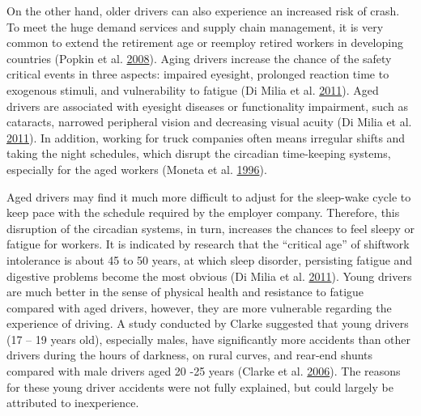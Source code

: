 \documentclass[12pt]{book}
\numberwithin{equation}{chapter}
\begin{document}
On the other hand, older drivers can also experience an increased risk of crash. To meet the huge demand services and supply chain management, it is very common to extend the retirement age or reemploy retired workers in developing countries (Popkin et al. \protect\hyperlink{ref-popkin2008age}{2008}). Aging drivers increase the chance of the safety critical events in three aspects: impaired eyesight, prolonged reaction time to exogenous stimuli, and vulnerability to fatigue (Di Milia et al. \protect\hyperlink{ref-di2011demographic}{2011}). Aged drivers are associated with eyesight diseases or functionality impairment, such as cataracts, narrowed peripheral vision and decreasing visual acuity (Di Milia et al. \protect\hyperlink{ref-di2011demographic}{2011}). In addition, working for truck companies often means irregular shifts and taking the night schedules, which disrupt the circadian time-keeping systems, especially for the aged workers (Moneta et al. \protect\hyperlink{ref-moneta1996time}{1996}).

Aged drivers may find it much more difficult to adjust for the sleep-wake cycle to keep pace with the schedule required by the employer company. Therefore, this disruption of the circadian systems, in turn, increases the chances to feel sleepy or fatigue for workers. It is indicated by research that the ``critical age'' of shiftwork intolerance is about 45 to 50 years, at which sleep disorder, persisting fatigue and digestive problems become the most obvious (Di Milia et al. \protect\hyperlink{ref-di2011demographic}{2011}). Young drivers are much better in the sense of physical health and resistance to fatigue compared with aged drivers, however, they are more vulnerable regarding the experience of driving. A study conducted by Clarke suggested that young drivers (17 -- 19 years old), especially males, have significantly more accidents than other drivers during the hours of darkness, on rural curves, and rear-end shunts compared with male drivers aged 20 -25 years (Clarke et al. \protect\hyperlink{ref-clarke2006young}{2006}). The reasons for these young driver accidents were not fully explained, but could largely be attributed to inexperience.
\end{document}
